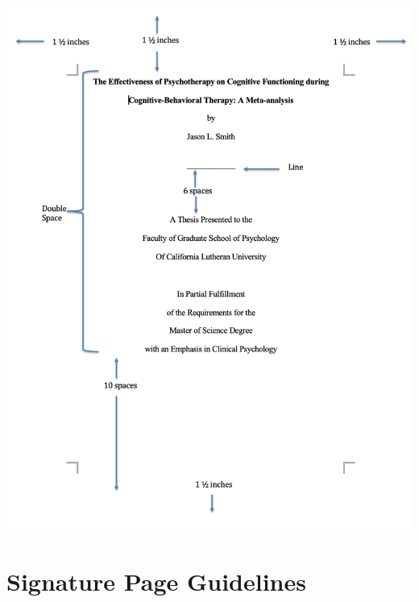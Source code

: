 \documentclass[openany]{book}
\begin{document}
\includegraphics[width=13.33in]{images/titlepage}

\hypertarget{signature-page-guidelines}{%
\section{Signature Page Guidelines}\label{signature-page-guidelines}}
\end{document}
